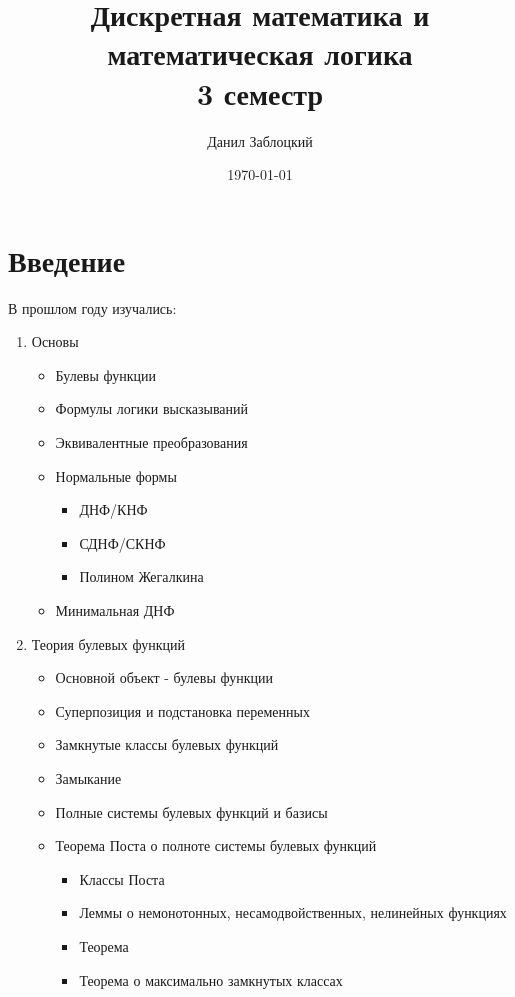 \documentclass{report}
\title{Дискретная математика и математическая логика \\ 3 семестр}
\author{Данил Заблоцкий}
\date{\today}
\theoremstyle{definition}
\begin{document}
\maketitle
\tableofcontents
\chapter*{Введение}

В прошлом году изучались:
\begin{enumerate}
    \item Основы
          \begin{itemize}
              \item Булевы функции
              \item Формулы логики высказываний
              \item Эквивалентные преобразования
              \item Нормальные формы
                    \begin{itemize}
                        \item ДНФ/КНФ
                        \item СДНФ/СКНФ
                        \item Полином Жегалкина
                    \end{itemize}
              \item Минимальная ДНФ
          \end{itemize}
    \item Теория булевых функций
          \begin{itemize}
              \item Основной объект - булевы функции
              \item Суперпозиция и подстановка переменных
              \item Замкнутые классы булевых функций
              \item Замыкание
              \item Полные системы булевых функций и базисы
              \item Теорема Поста о полноте системы булевых функций
                    \begin{itemize}
                        \item Классы Поста
                        \item Леммы о немонотонных, несамодвойственных, нелинейных функциях
                        \item Теорема
                        \item Теорема о максимально замкнутых классах

\end{itemize}
\end{itemize}
\end{enumerate}
\end{document}
